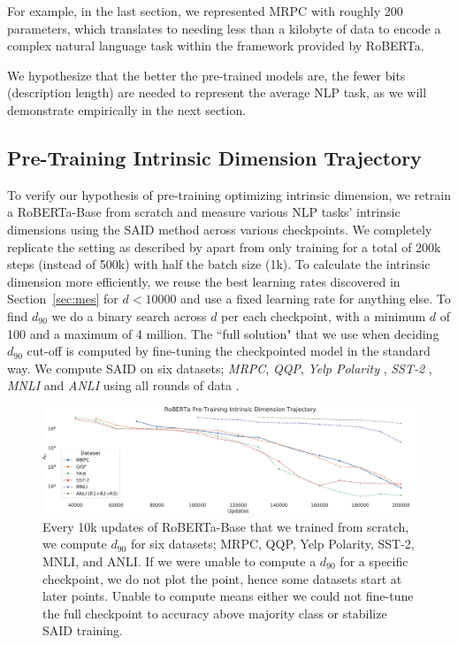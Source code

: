 \documentclass{article} %
\begin{document}
For example, in the last section, we represented MRPC with roughly 200 parameters, which translates to needing less than a kilobyte of data to encode a complex natural language task within the framework provided by RoBERTa.

We hypothesize that the better the pre-trained models are, the fewer bits (description length) are needed to represent the average NLP task, as we will demonstrate empirically in the next section.

\subsection{Pre-Training Intrinsic Dimension Trajectory}
\label{sec:trajectory}
To verify our hypothesis of pre-training optimizing intrinsic dimension, we retrain a RoBERTa-Base from scratch and measure various NLP tasks' intrinsic dimensions using the SAID method across various checkpoints. We completely replicate the setting as described by \citep{ROBERTA} apart from only training for a total of 200k steps (instead of 500k) with half the batch size (1k). To calculate the intrinsic dimension more efficiently, we reuse the best learning rates discovered in Section~\ref{sec:mes} for $d < 10000$ and use a fixed learning rate for anything else. To find $d_{90}$ we do a binary search across $d$ per each checkpoint, with a minimum $d$ of 100 and a maximum of 4 million. The ``full solution" that we use when deciding $d_{90}$ cut-off is computed by fine-tuning the checkpointed model in the standard way. We compute SAID on six datasets; \textit{MRPC}, \textit{QQP}, \textit{Yelp Polarity} \citep{yelp_polarity}, \textit{SST-2} \citep{sst2}, \textit{MNLI} \citep{mnli} and \textit{ANLI} using all rounds of data \citep{anli}.

\begin{figure}
    \centering
    \includegraphics[width=1.0\textwidth]{figures/roberta_trajectory.pdf}
    \caption{Every 10k updates of RoBERTa-Base that we trained from scratch, we compute $d_{90}$ for six datasets; MRPC, QQP, Yelp Polarity, SST-2, MNLI, and ANLI. If we were unable to compute a $d_{90}$ for a specific checkpoint, we do not plot the point, hence some datasets start at later points. Unable to compute means either we could not fine-tune the full checkpoint to accuracy above majority class or stabilize SAID training.}
    \label{fig:roberta_id}
\end{figure}
\end{document}
